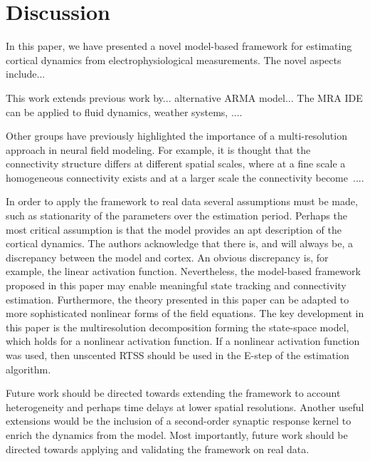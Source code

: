\documentclass[journal,a4paper]{IEEEtran}
\begin{document}
\section{Discussion}
In this paper, we have presented a novel model-based framework for estimating cortical dynamics from electrophysiological measurements. The novel aspects include...

This work extends previous work by... alternative ARMA model... The MRA IDE can be applied to fluid dynamics, weather systems, ....

Other groups have previously highlighted the importance of a multi-resolution approach in neural field modeling. For example, it is thought that the connectivity structure differs at different spatial scales, where at a fine scale a homogeneous connectivity exists and at a larger scale the connectivity become~\cite{Qubbaj2009}....

In order to apply the framework to real data several assumptions must be made, such as stationarity of the parameters over the estimation period. Perhaps the most critical assumption is that the model provides an apt description of the cortical dynamics. The authors acknowledge that there is, and will always be, a discrepancy between the model and cortex. An obvious discrepancy is, for example, the linear activation function. Nevertheless, the model-based framework proposed in this paper may enable meaningful state tracking and connectivity estimation. Furthermore, the theory presented in this paper can be adapted to more sophisticated nonlinear forms of the field equations. The key development in this paper is the multiresolution decomposition forming the state-space model, which holds for a nonlinear activation function. If a nonlinear activation function was used, then unscented RTSS should be used in the E-step of the estimation algorithm. 

Future work should be directed towards extending the framework to account heterogeneity and perhaps time delays at lower spatial resolutions. Another useful extensions would be the inclusion of a second-order synaptic response kernel to enrich the dynamics from the model. Most importantly, future work should be directed towards applying and validating the framework on real data.





\ifCLASSOPTIONcaptionsoff
  \newpage
\fi

%  
% 


 
\end{document}
